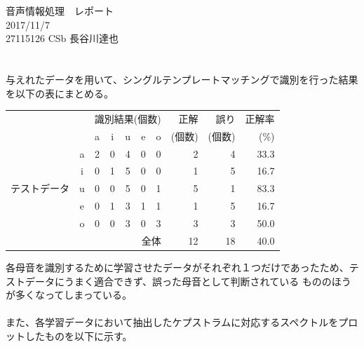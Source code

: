 \documentclass[10pt]{jsarticle}
\begin{document}
\begin{center}
{\LARGE 音声情報処理　レポート}\\
2017/11/7\\
 27115126 CSb 長谷川達也\\
\end{center}
\clearpage
\section{}
与えれたデータを用いて、シングルテンプレートマッチングで識別を行った結果を以下の表にまとめる。\\
\begin{table}[h]
\centering
\begin{tabular}{|cc||ccccc|rrr|} \hline
\multicolumn{2}{|c||}{} 	& \multicolumn{5}{c|}{識別結果(個数)}	& 正解	& 誤り		& 正解率\\
\multicolumn{2}{|c||}{} 	& a & i & u & e & o 			& (個数) 	& (個数) 	& (\%) \\ \hline \hline
	 	& a 	    	& 2 & 0 & 4 & 0 & 0 			& 2 		& 4 		& 33.3\\
		& i 		& 0 & 1 & 5 & 0 & 0 			& 1 		& 5 		& 16.7\\
テストデータ 	& u 		& 0 & 0 & 5 & 0 & 1 			& 5 		& 1 		& 83.3\\
	 	& e 		& 0 & 1 & 3 & 1 & 1 			& 1 		& 5 		& 16.7\\
	 	& o 		& 0 & 0 & 3 & 0 & 3 			& 3 		& 3 		& 50.0\\ \hline \hline
\multicolumn{7}{|r|}{全体} 						& 12		& 18		& 40.0\\ \hline
\end{tabular}
\end{table}
\par
各母音を識別するために学習させたデータがそれぞれ１つだけであったため、テストデータにうまく適合できず、誤った母音として判断されている
もののほうが多くなってしまっている。
\\ \\
また、各学習データにおいて抽出したケプストラムに対応するスペクトルをプロットしたものを以下に示す。
\end{document}
